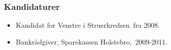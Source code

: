 \documentclass[11pt, a4paper]{awesome-cv}
\begin{document}
\begin{cvletter}
\subsubsection*{Kandidaturer}
\begin{itemize}
\item Kandidat for Venstre i Struerkredsen fra 2008.
\end{itemize}
\begin{itemize}
\item Bankrådgiver, Sparekassen Holstebro, 2009-2011.
\end{itemize}
\end{cvletter}
\end{document}
